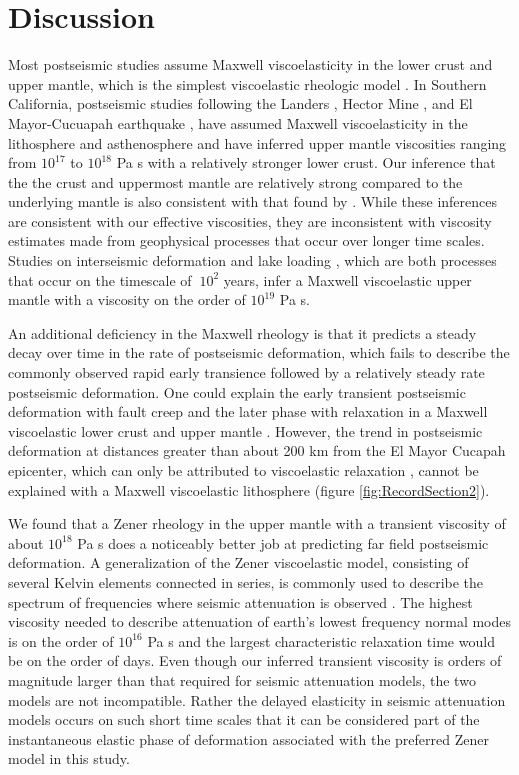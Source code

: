 \documentclass[1p]{elsarticle}
\begin{document}
\section{Discussion}

Most postseismic studies assume Maxwell viscoelasticity in the lower crust and upper mantle, which is the simplest viscoelastic rheologic model \citep[e.g.][]{Nur1974,Pollitz2000,Hetland2003,Freed2006a,Johnson2009,Hearn2009}.  In Southern California, postseismic studies following the Landers \citep{Pollitz2000}, Hector Mine \citep{Pollitz2001}, and El Mayor-Cucuapah earthquake \citep{Spinler2015,Rollins2015}, have assumed Maxwell viscoelasticity in the lithosphere and asthenosphere and have inferred upper mantle viscosities ranging from $10^{17}$ to $10^{18}$ Pa s with a relatively stronger lower crust. Our inference that the the crust and uppermost mantle are relatively strong compared to the underlying mantle is also consistent with that found by \citet{Freed2007a}.  While these inferences are consistent with our effective viscosities, they are inconsistent with viscosity estimates made from geophysical processes that occur over longer time scales. Studies on interseismic deformation \citep{Lundgren2009} and lake loading \citep{Luttrell2007}, which are both processes that occur on the timescale of $~10^2$ years, infer a Maxwell viscoelastic upper mantle with a viscosity on the order of $10^{19}$ Pa s. 

An additional deficiency in the Maxwell rheology is that it predicts a steady decay over time in the rate of postseismic deformation, which fails to describe the commonly observed rapid early transience followed by a relatively steady rate postseismic deformation.  One could explain the early transient postseismic deformation with fault creep and the later phase with relaxation in a Maxwell viscoelastic lower crust and upper mantle \citep[e.g][]{Hearn2009,Johnson2009}. However, the trend in postseismic deformation at distances greater than about 200 km from the El Mayor Cucapah epicenter, which can only be attributed to viscoelastic relaxation \citep{Freed2007a}, cannot be explained with a Maxwell viscoelastic lithosphere (figure \ref{fig:RecordSection2}). 

We found that a Zener rheology in the upper mantle with a transient viscosity of about $10^{18}$ Pa s does a noticeably better job at predicting far field postseismic deformation.  A generalization of the Zener viscoelastic model, consisting of several Kelvin elements connected in series, is commonly used to describe the spectrum of frequencies where seismic attenuation is observed \citep{Liu1976}.  The highest viscosity needed to describe attenuation of earth's lowest frequency normal modes is on the order of $10^{16}$ Pa s \citep{Yuen1982} and the largest characteristic relaxation time would be on the order of days. Even though our inferred transient viscosity is orders of magnitude larger than that required for seismic attenuation models, the two models are not incompatible.  Rather the delayed elasticity in seismic attenuation models occurs on such short time scales that it can be considered  part of the instantaneous elastic phase of deformation associated with the preferred Zener model in this study. 
\end{document}
